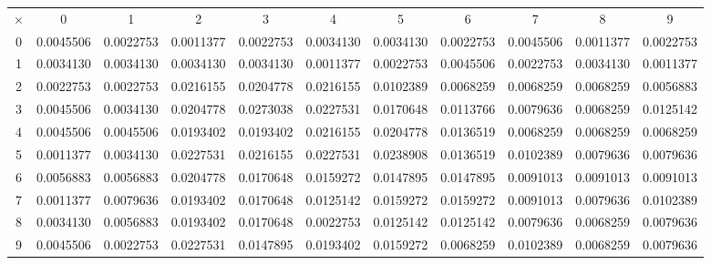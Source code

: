 
\begin{table}
\begin{tabular}{ccccccccccc}
$\times$&0&1&2&3&4&5&6&7&8&9\\
0& 0.0045506& 0.0022753& 0.0011377& 0.0022753& 0.0034130& 0.0034130& 0.0022753& 0.0045506& 0.0011377& 0.0022753\\
1& 0.0034130& 0.0034130& 0.0034130& 0.0034130& 0.0011377& 0.0022753& 0.0045506& 0.0022753& 0.0034130& 0.0011377\\
2& 0.0022753& 0.0022753& 0.0216155& 0.0204778& 0.0216155& 0.0102389& 0.0068259& 0.0068259& 0.0068259& 0.0056883\\
3& 0.0045506& 0.0034130& 0.0204778& 0.0273038& 0.0227531& 0.0170648& 0.0113766& 0.0079636& 0.0068259& 0.0125142\\
4& 0.0045506& 0.0045506& 0.0193402& 0.0193402& 0.0216155& 0.0204778& 0.0136519& 0.0068259& 0.0068259& 0.0068259\\
5& 0.0011377& 0.0034130& 0.0227531& 0.0216155& 0.0227531& 0.0238908& 0.0136519& 0.0102389& 0.0079636& 0.0079636\\
6& 0.0056883& 0.0056883& 0.0204778& 0.0170648& 0.0159272& 0.0147895& 0.0147895& 0.0091013& 0.0091013& 0.0091013\\
7& 0.0011377& 0.0079636& 0.0193402& 0.0170648& 0.0125142& 0.0159272& 0.0159272& 0.0091013& 0.0079636& 0.0102389\\
8& 0.0034130& 0.0056883& 0.0193402& 0.0170648& 0.0022753& 0.0125142& 0.0125142& 0.0079636& 0.0068259& 0.0079636\\
9& 0.0045506& 0.0022753& 0.0227531& 0.0147895& 0.0193402& 0.0159272& 0.0068259& 0.0102389& 0.0068259& 0.0079636
\end{tabular}
\end{table}

